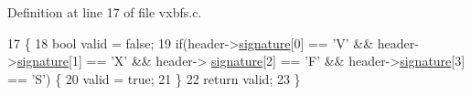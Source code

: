 Definition at line 17 of file vxbfs.\+c.


\begin{DoxyCode}
17                                         \{
18     \textcolor{keywordtype}{bool} valid = \textcolor{keyword}{false};
19     \textcolor{keywordflow}{if}(header->\hyperlink{a00344_a4c82fb69a08f04d22d832e030cc71577_a4c82fb69a08f04d22d832e030cc71577}{signature}[0] == \textcolor{charliteral}{'V'} && header->\hyperlink{a00344_a4c82fb69a08f04d22d832e030cc71577_a4c82fb69a08f04d22d832e030cc71577}{signature}[1] == \textcolor{charliteral}{'X'} && header->
      \hyperlink{a00344_a4c82fb69a08f04d22d832e030cc71577_a4c82fb69a08f04d22d832e030cc71577}{signature}[2] == \textcolor{charliteral}{'F'} && header->\hyperlink{a00344_a4c82fb69a08f04d22d832e030cc71577_a4c82fb69a08f04d22d832e030cc71577}{signature}[3] == \textcolor{charliteral}{'S'}) \{
20         valid = \textcolor{keyword}{true};
21     \}
22     \textcolor{keywordflow}{return} valid;
23 \}
\end{DoxyCode}
